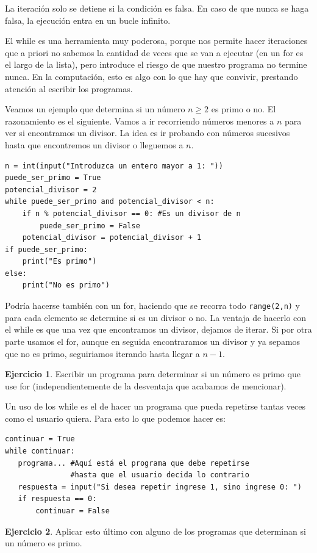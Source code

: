 \documentclass[a4paper, 12pt]{report}
\theoremstyle{definition}
\newtheorem{ejercicio}{Ejercicio}[section]
\begin{document}
La iteración solo se detiene si la condición es falsa. En caso de que nunca se haga falsa, la ejecución entra en un bucle infinito.

El while es una herramienta muy poderosa, porque nos permite hacer iteraciones que a priori no sabemos la cantidad de veces que se van a ejecutar (en un for es el largo de la lista), pero introduce el riesgo de que nuestro programa no termine nunca. En la computación, esto es algo con lo que hay que convivir, prestando atención al escribir los programas.

Veamos un ejemplo que determina si un número $n\geq 2$ es primo o no. El razonamiento es el siguiente. Vamos a ir recorriendo números menores a $n$ para ver si encontramos un divisor. La idea es ir probando con números sucesivos hasta que encontremos un divisor o lleguemos a $n$.
\begin{verbatim}
n = int(input("Introduzca un entero mayor a 1: "))
puede_ser_primo = True
potencial_divisor = 2
while puede_ser_primo and potencial_divisor < n:
    if n % potencial_divisor == 0: #Es un divisor de n
        puede_ser_primo = False
    potencial_divisor = potencial_divisor + 1
if puede_ser_primo:
    print("Es primo")
else:
    print("No es primo")
\end{verbatim}
Podría hacerse también con un for, haciendo que se recorra todo {\tt range(2,n)} y para cada elemento se determine si es un divisor o no. La ventaja de hacerlo con el while es que una vez que encontramos un divisor, dejamos de iterar. Si por otra parte usamos el for, aunque en seguida encontraramos un divisor y ya sepamos que no es primo, seguiriamos iterando hasta llegar a $n-1$.
\begin{ejercicio}
	Escribir un programa para determinar si un número es primo que use for (independientemente de la desventaja que acabamos de mencionar).
\end{ejercicio}

Un uso de los while es el de hacer un programa que pueda repetirse tantas veces como el usuario quiera. Para esto lo que podemos hacer es:
\begin{verbatim}
continuar = True
while continuar:
   programa... #Aquí está el programa que debe repetirse
               #hasta que el usuario decida lo contrario
   respuesta = input("Si desea repetir ingrese 1, sino ingrese 0: ")
   if respuesta == 0:
       continuar = False
\end{verbatim}
\begin{ejercicio}
	Aplicar esto último con alguno de los programas que determinan si un número es primo.
\end{ejercicio}
\end{document}
